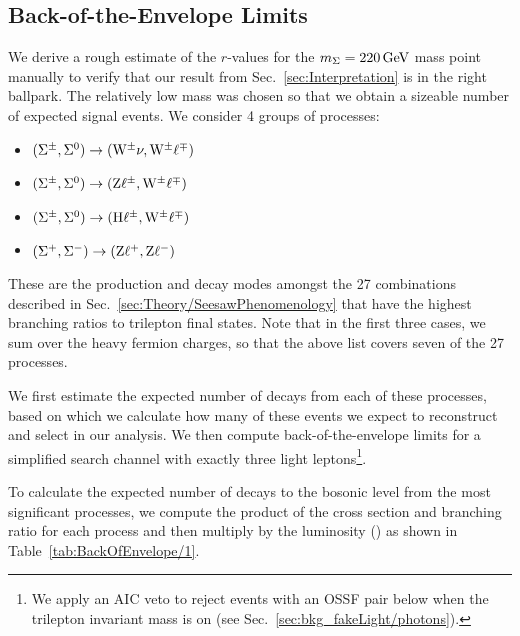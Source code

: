 \subsection{Back-of-the-Envelope Limits}
\label{sec:Results/BackOfEnvelope}
We derive a rough estimate of the $r$-values for the $m_\Sigma = 220\,\text{Ge\hspace{-.08em}V}$ mass point manually to verify that our result from Sec.~\ref{sec:Interpretation} is in the right ballpark. The relatively low mass was chosen so that we obtain a sizeable number of expected signal events. We consider 4 groups of processes:
\begin{itemize}
	\item $(\Sigma^\pm, \Sigma^0) \to (\mathrm{W}^\pm \nu, \mathrm{W}^\pm \ell^\mp)$
	\item $(\Sigma^\pm, \Sigma^0) \to (\mathrm{Z} \ell^\pm, \mathrm{W}^\pm \ell^\mp)$
	\item $(\Sigma^\pm, \Sigma^0) \to (\mathrm{H} \ell^\pm, \mathrm{W}^\pm \ell^\mp)$
	\item $(\Sigma^+, \Sigma^-) \to (\mathrm{Z} \ell^+, \mathrm{Z} \ell^-)$
\end{itemize}
These are the production and decay modes amongst the 27 combinations described in Sec.~\ref{sec:Theory/SeesawPhenomenology} that have the highest branching ratios to trilepton final states. Note that in the first three cases, we sum over the heavy fermion charges, so that the above list covers seven of the 27 processes.

We first estimate the expected number of decays from each of these processes, based on which we calculate how many of these events we expect to reconstruct and select in our analysis. We then compute back-of-the-envelope limits for a simplified search channel with exactly three light leptons\footnote{We apply an AIC veto to reject events with an OSSF pair below \Z when the trilepton invariant mass is on \Z (see Sec.~\ref{sec:bkg_fakeLight/photons}).}.

To calculate the expected number of decays to the bosonic level from the most significant processes, we compute the product of the cross section and branching ratio for each process and then multiply by the luminosity (\fullLumi) as shown in Table~\ref{tab:BackOfEnvelope/1}.

